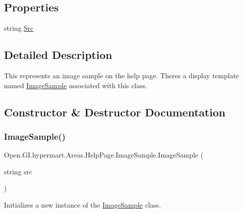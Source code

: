 \subsection*{Properties}
\begin{DoxyCompactItemize}
\item 
string \hyperlink{class_open_1_1_g_i_1_1hypermart_1_1_areas_1_1_help_page_1_1_image_sample_a19a1c712823d2e81590e2be51f2e30fb}{Src}
\end{DoxyCompactItemize}


\subsection{Detailed Description}
This represents an image sample on the help page. There\textquotesingle{}s a display template named \hyperlink{class_open_1_1_g_i_1_1hypermart_1_1_areas_1_1_help_page_1_1_image_sample}{Image\+Sample} associated with this class. 



\subsection{Constructor \& Destructor Documentation}
\hypertarget{class_open_1_1_g_i_1_1hypermart_1_1_areas_1_1_help_page_1_1_image_sample_a3570ac8793e478a72e64041784f39120}{}\label{class_open_1_1_g_i_1_1hypermart_1_1_areas_1_1_help_page_1_1_image_sample_a3570ac8793e478a72e64041784f39120} 
\subsubsection{\texorpdfstring{Image\+Sample()}{ImageSample()}}
{\footnotesize\ttfamily Open.\+G\+I.\+hypermart.\+Areas.\+Help\+Page.\+Image\+Sample.\+Image\+Sample (\begin{DoxyParamCaption}\item[{string}]{src }\end{DoxyParamCaption})}



Initializes a new instance of the \hyperlink{class_open_1_1_g_i_1_1hypermart_1_1_areas_1_1_help_page_1_1_image_sample}{Image\+Sample} class. 


